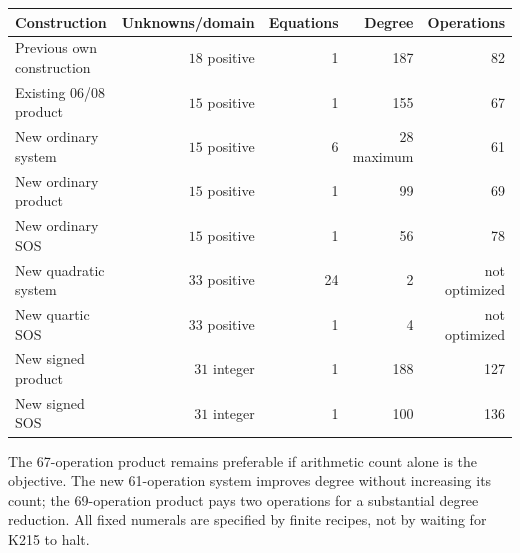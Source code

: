 \documentclass[11pt]{article}
\begin{document}
\begin{center}\small
\begin{tabular}{lrrrr}
\toprule
Construction & Unknowns/domain & Equations & Degree & Operations\\
\midrule
Previous own construction & $18$ positive &1&187&82\\
Existing 06/08 product & $15$ positive &1&155&67\\
New ordinary system & $15$ positive &6&$28$ maximum&61\\
New ordinary product & $15$ positive &1&99&69\\
New ordinary SOS & $15$ positive &1&56&78\\
New quadratic system & $33$ positive &24&2&not optimized\\
New quartic SOS & $33$ positive &1&4&not optimized\\
New signed product & $31$ integer &1&188&127\\
New signed SOS & $31$ integer &1&100&136\\
\bottomrule
\end{tabular}
\end{center}
The 67-operation product remains preferable if arithmetic count alone is the objective. The new 61-operation system improves degree without increasing its count; the 69-operation product pays two operations for a substantial degree reduction. All fixed numerals are specified by finite recipes, not by waiting for K215 to halt.
\end{document}
